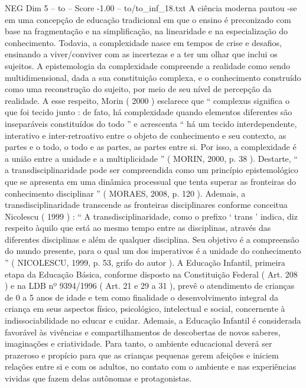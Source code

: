 \begin{textsample}{NEG Dim 5 – to – Score -1.00 – to/to\_inf\_18.txt}  \label{ex:f5_neg_263}
A ciência moderna pautou -se em uma concepção de educação tradicional em que o ensino é preconizado com base na fragmentação e na simplificação, na linearidade e na especialização do conhecimento.
Todavia, a complexidade nasce em tempos de crise e desafios, ensinando a viver/conviver com as incertezas e a ter um olhar que inclui os sujeitos.
A epistemologia da complexidade compreende a realidade como sendo multidimensional, dada a sua constituição complexa, e o conhecimento construído como uma reconstrução do sujeito, por meio de seu nível de percepção da realidade.
A esse respeito, Morin ( 2000 ) esclarece que “ complexus significa o que foi tecido junto : de fato, há complexidade quando elementos diferentes são inseparáveis constituídos do todo ” e acrescenta “ há um tecido interdependente, interativo e inter-retroativo entre o objeto de conhecimento e seu contexto, as partes e o todo, o todo e as partes, as partes entre si.
Por isso, a complexidade é a união entre a unidade e a multiplicidade ” ( MORIN, 2000, p. 38 ).
Destarte, “ a transdisciplinaridade pode ser compreendida como um princípio epistemológico que se apresenta em uma dinâmica processual que tenta superar as fronteiras do conhecimento disciplinar ” ( MORAES, 2008, p. 120 ).
Ademais, a transdisciplinaridade transcende as fronteiras disciplinares conforme conceitua Nicolescu ( 1999 ) : “ A transdisciplinaridade, como o prefixo ‘ trans ’ indica, diz respeito àquilo que está ao mesmo tempo entre as disciplinas, através das diferentes disciplinas e além de qualquer disciplina.
Seu objetivo é a compreensão do mundo presente, para o qual um dos imperativos é a unidade do conhecimento ” ( NICOLESCU, 1999, p. 53, grifo do autor ).
A Educação Infantil, primeira etapa da Educação Básica, conforme disposto na Constituição Federal ( Art. 208 ) e na LDB nº 9394/1996 ( Art. 21 e 29 a 31 ), prevê o atendimento de crianças de 0 a 5 anos de idade e tem como finalidade o desenvolvimento integral da criança em seus aspectos físico, psicológico, intelectual e social, concernente à indissociabilidade no educar e cuidar.
Ademais, a Educação Infantil é considerada favorável às vivências e compartilhamentos de descobertas de novos saberes, imaginações e criatividade.
Para tanto, o ambiente educacional deverá ser prazeroso e propício para que as crianças pequenas gerem afeições e iniciem relações entre si e com os adultos, no contato com o ambiente e nas experiências vividas que fazem delas autônomas e protagonistas.

\end{textsample}
